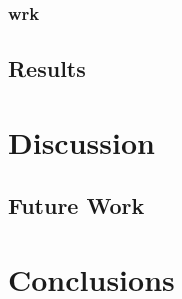 \documentclass[twoside,openright]{uva-bachelor-thesis}
\begin{document}
\subsection{wrk}
\section{Results}

\chapter{Discussion}
\section{Future Work}
\chapter{Conclusions}


\printbibliography[heading=bibintoc]{}

\printglossaries{}
\end{document}
